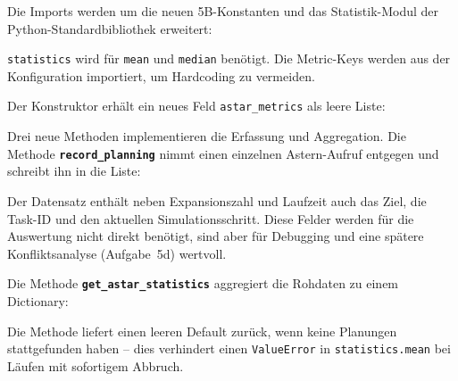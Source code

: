 Die Imports werden um die neuen 5B-Konstanten und das Statistik-Modul der Python-Standardbibliothek erweitert:





\texttt{statistics} wird für \texttt{mean} und \texttt{median} benötigt. Die Metric-Keys werden aus der Konfiguration importiert, um Hardcoding zu vermeiden.

Der Konstruktor erhält ein neues Feld \texttt{astar\_metrics} als leere Liste:




Drei neue Methoden implementieren die Erfassung und Aggregation. Die Methode \textbf{\texttt{record\_planning}} nimmt einen einzelnen \acs{Astern}-Aufruf entgegen und schreibt ihn in die Liste:



Der Datensatz enthält neben Expansionszahl und Laufzeit auch das Ziel, die Task-ID und den aktuellen Simulationsschritt. Diese Felder werden für die Auswertung nicht direkt benötigt, sind aber für Debugging und eine spätere Konfliktsanalyse (Aufgabe~5d) wertvoll.

Die Methode \textbf{\texttt{get\_astar\_statistics}} aggregiert die Rohdaten zu einem Dictionary:



Die Methode liefert einen leeren Default zurück, wenn keine Planungen stattgefunden haben -- dies verhindert einen \texttt{ValueError} in \texttt{statistics.mean} bei Läufen mit sofortigem Abbruch.


